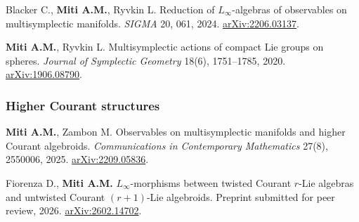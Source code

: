 \documentclass[a4paper,fontsize=11bp]{scrartcl}
\newenvironment{refsection}{\begingroup}{\endgroup}
\begin{document}
\begin{refsection}
\begin{ERCoutputlist}
\setcounter{ERCselectedoutput}{1}
\item Blacker C., \textbf{Miti A.M.}, Ryvkin L.
Reduction of $L_\infty$-algebras of observables on multisymplectic manifolds.
\emph{SIGMA} 20, 061, 2024.
\href{https://arxiv.org/abs/2206.03137}{arXiv:2206.03137}.

\setcounter{ERCselectedoutput}{2}
\item \textbf{Miti A.M.}, Ryvkin L.
Multisymplectic actions of compact Lie groups on spheres.
\emph{Journal of Symplectic Geometry} 18(6), 1751--1785, 2020.
\href{https://arxiv.org/abs/1906.08790}{arXiv:1906.08790}.

\end{ERCoutputlist}

\subsubsection*{Higher Courant structures}

%
\begin{ERCoutputlist}
\setcounter{ERCselectedoutput}{3}
\item \textbf{Miti A.M.}, Zambon M.
Observables on multisymplectic manifolds and higher Courant algebroids.
\emph{Communications in Contemporary Mathematics} 27(8), 2550006, 2025.
\href{https://arxiv.org/abs/2209.05836}{arXiv:2209.05836}.

\setcounter{ERCselectedoutput}{4}
\item Fiorenza D., \textbf{Miti A.M.}
$L_\infty$-morphisms between twisted Courant $r$-Lie algebras and untwisted
Courant $(r{+}1)$-Lie algebroids. Preprint submitted for peer review, 2026.
\href{https://arxiv.org/abs/2602.14702}{arXiv:2602.14702}.


\end{ERCoutputlist}
\end{refsection}
\end{document}
